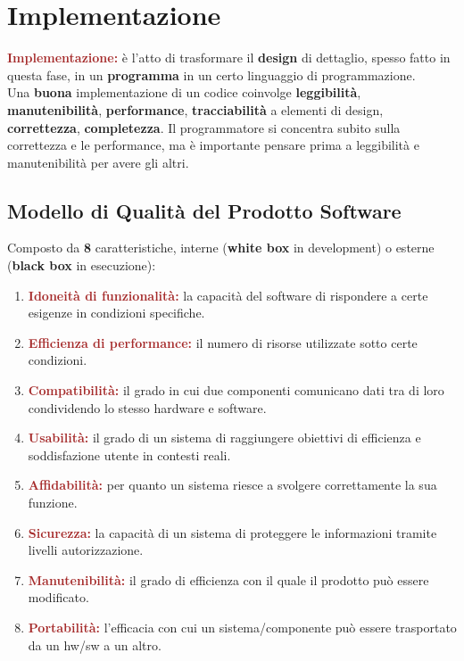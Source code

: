 \chapter{Implementazione}
\begin{boxDef}
\textbf{\textcolor{brown}{Implementazione:}} è l'atto di trasformare il \textbf{design} di dettaglio, spesso fatto in questa fase, in un \textbf{programma} in un certo linguaggio di programmazione. \\
Una \textbf{buona} implementazione di un codice coinvolge \textbf{leggibilità}, \textbf{manutenibilità}, \textbf{performance}, \textbf{tracciabilità} a elementi di design, \textbf{correttezza}, \textbf{completezza}.
Il programmatore si concentra subito sulla correttezza e le performance, ma è importante pensare prima a leggibilità e manutenibilità per avere gli altri.
\end{boxDef}

\section{Modello di Qualità del Prodotto Software}
Composto da \textbf{8} caratteristiche, interne (\textbf{white box} in development) o esterne (\textbf{black box} in esecuzione):
\begin{enumerate}
    \item \textbf{\textcolor{brown}{Idoneità di funzionalità:}} la capacità del software di rispondere a certe esigenze in condizioni specifiche.
    \item \textbf{\textcolor{brown}{Efficienza di performance:}} il numero di risorse utilizzate sotto certe condizioni.
    \item \textbf{\textcolor{brown}{Compatibilità:}} il grado in cui due componenti comunicano dati tra di loro condividendo lo stesso hardware e software.
    \item \textbf{\textcolor{brown}{Usabilità:}} il grado di un sistema di raggiungere obiettivi di efficienza e soddisfazione utente in contesti reali.
    \item \textbf{\textcolor{brown}{Affidabilità:}} per quanto un sistema riesce a svolgere correttamente la sua funzione.
    \item \textbf{\textcolor{brown}{Sicurezza:}} la capacità di un sistema di proteggere le informazioni tramite livelli autorizzazione.
    \item \textbf{\textcolor{brown}{Manutenibilità:}} il grado di efficienza con il quale il prodotto può essere modificato.
    \item \textbf{\textcolor{brown}{Portabilità:}} l'efficacia con cui un sistema/componente può essere trasportato da un hw/sw a un altro.
\end{enumerate}

